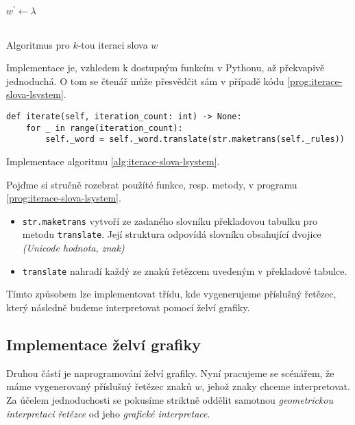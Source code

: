 \begin{algorithm}[h]
    $w^\prime\gets\lambda$\\
    \\
    \caption{Algoritmus pro $k$-tou iteraci slova $w$}
    \label{alg:iterace-slova-lsystem}
\end{algorithm}
Implementace je, vzhledem k dostupným funkcím v Pythonu, až překvapivě jednoduchá. O tom se čtenář může přesvědčit sám v případě kódu \ref{prog:iterace-slova-lsystem}.
\begin{program}[h]
\begin{lstlisting}[style=python]
def iterate(self, iteration_count: int) -> None:
    for _ in range(iteration_count):
        self._word = self._word.translate(str.maketrans(self._rules))
\end{lstlisting}
    \caption{Implementace algoritmu \ref{alg:iterace-slova-lsystem}.}
    \label{prog:iterace-slova-lsystem}
\end{program}
Pojďme si stručně rozebrat použíté funkce, resp. metody, v programu \ref{prog:iterace-slova-lsystem}.
\begin{itemize}
    \item \texttt{str.maketrans} vytvoří ze zadaného slovníku překladovou tabulku pro metodu \texttt{translate}. Její struktura odpovídá slovníku obsahující dvojice \emph{(Unicode hodnota, znak)}
    \item \texttt{translate} nahradí každý ze znaků řetězcem uvedeným v překladové tabulce.
\end{itemize}
Tímto způsobem lze implementovat třídu, kde vygenerujeme příslušný řetězec, který následně budeme interpretovat pomocí želví grafiky.

\subsection{Implementace želví grafiky}\label{subsec:implementace-zelvi-grafiky}

Druhou částí je naprogramování želví grafiky. Nyní pracujeme se scénářem, že máme vygenerovaný příslušný řetězec znaků $w$, jehož znaky chceme interpretovat. Za účelem jednoduchosti se pokusíme striktně oddělit samotnou \emph{geometrickou interpretaci řetězce} od jeho \emph{grafické interpretace}.

